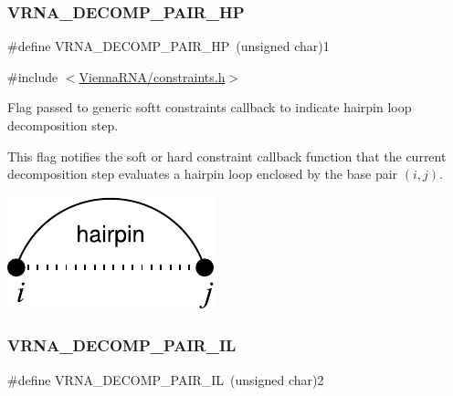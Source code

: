 \subsubsection{\texorpdfstring{V\+R\+N\+A\+\_\+\+D\+E\+C\+O\+M\+P\+\_\+\+P\+A\+I\+R\+\_\+\+HP}{VRNA\_DECOMP\_PAIR\_HP}}
{\footnotesize\ttfamily \#define V\+R\+N\+A\+\_\+\+D\+E\+C\+O\+M\+P\+\_\+\+P\+A\+I\+R\+\_\+\+HP~(unsigned char)1}



{\ttfamily \#include $<$\hyperlink{constraints_8h}{Vienna\+R\+N\+A/constraints.\+h}$>$}



Flag passed to generic softt constraints callback to indicate hairpin loop decomposition step. 

This flag notifies the soft or hard constraint callback function that the current decomposition step evaluates a hairpin loop enclosed by the base pair $(i,j)$.

 
\begin{DoxyImageNoCaption}
  \mbox{\includegraphics[width=\textwidth,height=\textheight/2,keepaspectratio=true]{decomp_hp}}
\end{DoxyImageNoCaption}
 \mbox{\label{group__constraints_gaeab04f34d7730cff2d651d782f95d857}} 
\subsubsection{\texorpdfstring{V\+R\+N\+A\+\_\+\+D\+E\+C\+O\+M\+P\+\_\+\+P\+A\+I\+R\+\_\+\+IL}{VRNA\_DECOMP\_PAIR\_IL}}
{\footnotesize\ttfamily \#define V\+R\+N\+A\+\_\+\+D\+E\+C\+O\+M\+P\+\_\+\+P\+A\+I\+R\+\_\+\+IL~(unsigned char)2}



